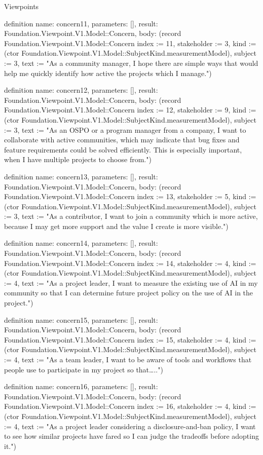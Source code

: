 \begin{lexlean}{Viewpoints}
\begin{semanticmodule}
definition{
  name: concern11,
  parameters: [],
  result: Foundation.Viewpoint.V1.Model::Concern,
  body: (record Foundation.Viewpoint.V1.Model::Concern {index := 11, stakeholder := 3, kind := (ctor Foundation.Viewpoint.V1.Model::SubjectKind.measurementModel), subject := 3, text := "As a community manager, I hope there are simple ways that would help me quickly identify how active the projects which I manage."})
}

definition{
  name: concern12,
  parameters: [],
  result: Foundation.Viewpoint.V1.Model::Concern,
  body: (record Foundation.Viewpoint.V1.Model::Concern {index := 12, stakeholder := 9, kind := (ctor Foundation.Viewpoint.V1.Model::SubjectKind.measurementModel), subject := 3, text := "As an OSPO or a program manager from a company, I want to collaborate with active communities, which may indicate that bug fixes and feature requirements could be solved efficiently. This is especially important, when I have multiple projects to choose from."})
}

definition{
  name: concern13,
  parameters: [],
  result: Foundation.Viewpoint.V1.Model::Concern,
  body: (record Foundation.Viewpoint.V1.Model::Concern {index := 13, stakeholder := 5, kind := (ctor Foundation.Viewpoint.V1.Model::SubjectKind.measurementModel), subject := 3, text := "As a contributor, I want to join a community which is more active, because I may get more support and the value I create is more visible."})
}

definition{
  name: concern14,
  parameters: [],
  result: Foundation.Viewpoint.V1.Model::Concern,
  body: (record Foundation.Viewpoint.V1.Model::Concern {index := 14, stakeholder := 4, kind := (ctor Foundation.Viewpoint.V1.Model::SubjectKind.measurementModel), subject := 4, text := "As a project leader, I want to measure the existing use of AI in my community so that I can determine future project policy on the use of AI in the project."})
}

definition{
  name: concern15,
  parameters: [],
  result: Foundation.Viewpoint.V1.Model::Concern,
  body: (record Foundation.Viewpoint.V1.Model::Concern {index := 15, stakeholder := 4, kind := (ctor Foundation.Viewpoint.V1.Model::SubjectKind.measurementModel), subject := 4, text := "As a team leader, I want to be aware of tools and workflows that people use to participate in my project so that….."})
}

definition{
  name: concern16,
  parameters: [],
  result: Foundation.Viewpoint.V1.Model::Concern,
  body: (record Foundation.Viewpoint.V1.Model::Concern {index := 16, stakeholder := 4, kind := (ctor Foundation.Viewpoint.V1.Model::SubjectKind.measurementModel), subject := 4, text := "As a project leader considering a disclosure-and-ban policy, I want to see how similar projects have fared so I can judge the tradeoffs before adopting it."})
}


\end{semanticmodule}
\end{lexlean}
